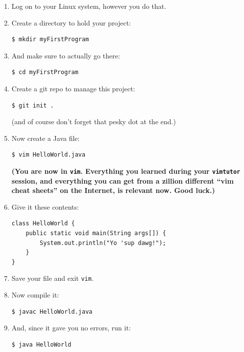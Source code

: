 \begin{enumerate}
\itemsep.1em
\item Log on to your Linux system, however you do that.
\item Create a directory to hold your project:
\begin{verbatim}
$ mkdir myFirstProgram
\end{verbatim}

\item And make sure to actually go there:
\begin{verbatim}
$ cd myFirstProgram
\end{verbatim}

\item Create a git repo to manage this project:
\begin{verbatim}
$ git init .
\end{verbatim}

(and of course don't forget that pesky dot at the end.)

\item Now create a Java file:
\begin{verbatim}
$ vim HelloWorld.java
\end{verbatim}

\textbf{(You are now in \texttt{vim}. Everything you learned during your
\texttt{vimtutor} session, and everything you can get from a zillion different
``vim cheat sheets'' on the Internet, is relevant now. Good luck.)}

\item Give it these contents:
\begin{verbatim}
class HelloWorld {
    public static void main(String args[]) {
        System.out.println("Yo 'sup dawg!");
    }
}
\end{verbatim}

\item Save your file and exit \texttt{vim}.

\item Now compile it:
\begin{verbatim}
$ javac HelloWorld.java
\end{verbatim}

\item And, since it gave you no errors, run it:
\begin{verbatim}
$ java HelloWorld
\end{verbatim}

\end{enumerate}


